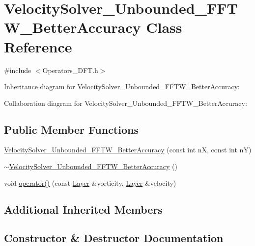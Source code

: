 \hypertarget{class_velocity_solver___unbounded___f_f_t_w___better_accuracy}{}\section{Velocity\+Solver\+\_\+\+Unbounded\+\_\+\+F\+F\+T\+W\+\_\+\+Better\+Accuracy Class Reference}
\label{class_velocity_solver___unbounded___f_f_t_w___better_accuracy}


{\ttfamily \#include $<$Operators\+\_\+\+D\+F\+T.\+h$>$}



Inheritance diagram for Velocity\+Solver\+\_\+\+Unbounded\+\_\+\+F\+F\+T\+W\+\_\+\+Better\+Accuracy\+:


Collaboration diagram for Velocity\+Solver\+\_\+\+Unbounded\+\_\+\+F\+F\+T\+W\+\_\+\+Better\+Accuracy\+:
\subsection*{Public Member Functions}
\begin{DoxyCompactItemize}
\item 
\hyperlink{class_velocity_solver___unbounded___f_f_t_w___better_accuracy_a83c87183908cd6a75e46c789156db1de}{Velocity\+Solver\+\_\+\+Unbounded\+\_\+\+F\+F\+T\+W\+\_\+\+Better\+Accuracy} (const int n\+X, const int n\+Y)
\item 
\hyperlink{class_velocity_solver___unbounded___f_f_t_w___better_accuracy_abc43c362d0de7b3b256b1989ff316aa7}{$\sim$\+Velocity\+Solver\+\_\+\+Unbounded\+\_\+\+F\+F\+T\+W\+\_\+\+Better\+Accuracy} ()
\item 
void \hyperlink{class_velocity_solver___unbounded___f_f_t_w___better_accuracy_a198cd7b4b476ce4c9d9284e16ec29883}{operator()} (const \hyperlink{struct_layer}{Layer} \&vorticity, \hyperlink{struct_layer}{Layer} \&velocity)
\end{DoxyCompactItemize}
\subsection*{Additional Inherited Members}


\subsection{Constructor \& Destructor Documentation}
\hypertarget{class_velocity_solver___unbounded___f_f_t_w___better_accuracy_a83c87183908cd6a75e46c789156db1de}{}
